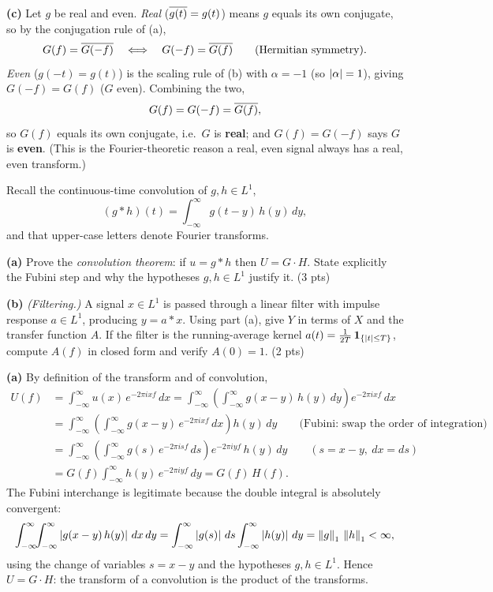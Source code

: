 \documentclass[11pt]{article}
\begin{document}
\textbf{(c)} Let $g$ be real and even. \emph{Real} ($\overline{g(t)}=g(t)$) means $g$ equals its own conjugate, so by the conjugation rule of (a),
\[
G(f)=\overline{G(-f)}\quad\Longleftrightarrow\quad G(-f)=\overline{G(f)}\qquad(\text{Hermitian symmetry}).
\]
\emph{Even} ($g(-t)=g(t)$) is the scaling rule of (b) with $\alpha=-1$ (so $\left\lvert \alpha \right\rvert=1$), giving $G(-f)=G(f)$ ($G$ even). Combining the two,
\[
G(f)=G(-f)=\overline{G(f)},
\]
so $G(f)$ equals its own conjugate, i.e.\ $G$ is \textbf{real}; and $G(f)=G(-f)$ says $G$ is \textbf{even}. (This is the Fourier-theoretic reason a real, even signal always has a real, even transform.)

\statementstart
Recall the continuous-time convolution of $g,h\in L^1$,
\[
(g*h)(t)=\int_{-\infty}^{\infty} g(t-y)\,h(y)\,dy ,
\]
and that upper-case letters denote Fourier transforms.

\textbf{(a)} Prove the \emph{convolution theorem}: if $u=g*h$ then $U=G\cdot H$. State explicitly the Fubini step and why the hypotheses $g,h\in L^1$ justify it. \hfill(3 pts)

\textbf{(b)} \emph{(Filtering.)} A signal $x\in L^1$ is passed through a linear filter with impulse response $a\in L^1$, producing $y=a*x$. Using part (a), give $Y$ in terms of $X$ and the transfer function $A$. If the filter is the running-average kernel $a(t)=\tfrac1{2T}\,\mathbf{1}_{\{\left\lvert t \right\rvert\le T\}}$, compute $A(f)$ in closed form and verify $A(0)=1$. \hfill(2 pts)
\statementend

\textbf{(a)} By definition of the transform and of convolution,
\[
\begin{aligned}
U(f)&=\int_{-\infty}^{\infty} u(x)\,e^{-2\pi i x f}\,dx
     =\int_{-\infty}^{\infty}\!\left(\int_{-\infty}^{\infty} g(x-y)\,h(y)\,dy\right)e^{-2\pi i x f}\,dx\\[2pt]
    &=\int_{-\infty}^{\infty}\!\left(\int_{-\infty}^{\infty} g(x-y)\,e^{-2\pi i x f}\,dx\right)h(y)\,dy
     \qquad\text{(Fubini: swap the order of integration)}\\[2pt]
    &=\int_{-\infty}^{\infty}\!\left(\int_{-\infty}^{\infty} g(s)\,e^{-2\pi i s f}\,ds\right)e^{-2\pi i y f}\,h(y)\,dy
     \qquad (s=x-y,\ dx=ds)\\[2pt]
    &=G(f)\int_{-\infty}^{\infty} h(y)\,e^{-2\pi i y f}\,dy=G(f)\,H(f).
\end{aligned}
\]
The Fubini interchange is legitimate because the double integral is absolutely convergent:
\[
\int_{-\infty}^{\infty}\!\!\int_{-\infty}^{\infty}\left\lvert g(x-y)\,h(y) \right\rvert\,dx\,dy
=\int_{-\infty}^{\infty}\left\lvert g(s) \right\rvert\,ds\int_{-\infty}^{\infty}\left\lvert h(y) \right\rvert\,dy
=\left\lVert g \right\rVert_1\,\left\lVert h \right\rVert_1<\infty,
\]
using the change of variables $s=x-y$ and the hypotheses $g,h\in L^1$. Hence $U=G\cdot H$: the transform of a convolution is the product of the transforms.
\end{document}
